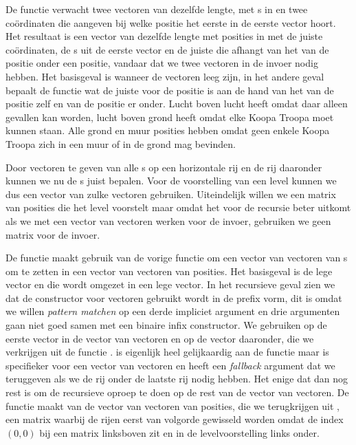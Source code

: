 De  functie verwacht twee vectoren van dezelfde lengte,
met s in en twee coördinaten die aangeven bij welke positie het
eerste  in de eerste vector hoort. Het resultaat is een vector
van dezelfde lengte met posities in met de juiste coördinaten, de
s uit de eerste vector en de juiste  die
afhangt van het  van de positie onder een positie, vandaar dat
we twee vectoren in de invoer nodig hebben. Het basisgeval is wanneer de
vectoren leeg zijn, in het andere geval bepaalt de functie 
wat de juiste  voor de positie is aan de hand van het
 van de positie zelf en van de positie er onder. Lucht boven
lucht heeft   omdat daar alleen gevallen kan
worden, lucht boven grond heeft   omdat elke Koopa
Troopa moet kunnen staan. Alle grond en muur posities hebben 
 omdat geen enkele Koopa Troopa zich in een muur of in de grond
mag bevinden.

Door vectoren te geven van alle s op een horizontale rij en de
rij daaronder kunnen we nu de s juist bepalen. Voor de
voorstelling van een level kunnen we dus een vector van zulke vectoren
gebruiken. Uiteindelijk willen we een matrix van posities die het level
voorstelt maar omdat het voor de recursie beter uitkomt als we met een vector
van vectoren werken voor de invoer, gebruiken we geen matrix voor de invoer.


De functie  maakt gebruik van de vorige functie om een
vector van vectoren van s om te zetten in een vector van
vectoren van posities. Het basisgeval is de lege vector en die wordt omgezet in
een lege vector. In het recursieve geval zien we dat de  constructor
voor vectoren gebruikt wordt in de prefix vorm, dit is omdat we willen
\emph{pattern matchen} op een derde impliciet argument en drie argumenten gaan
niet goed samen met een binaire infix constructor. We gebruiken
 op de eerste vector in de vector van vectoren en op de
vector daaronder, die we verkrijgen uit de functie .
 is eigenlijk heel gelijkaardig aan de  functie maar
is specifieker voor een vector van vectoren en heeft een \emph{fallback}
argument dat we teruggeven als we de rij onder de laatste rij nodig hebben. Het
enige dat dan nog rest is om de recursieve oproep te doen op de rest van de
vector van vectoren. De  functie maakt van de vector van
vectoren van posities, die we terugkrijgen uit , een
matrix waarbij de rijen eerst van volgorde gewisseld worden omdat de index
$(0,0)$ bij een matrix linksboven zit en in de levelvoorstelling links onder.

